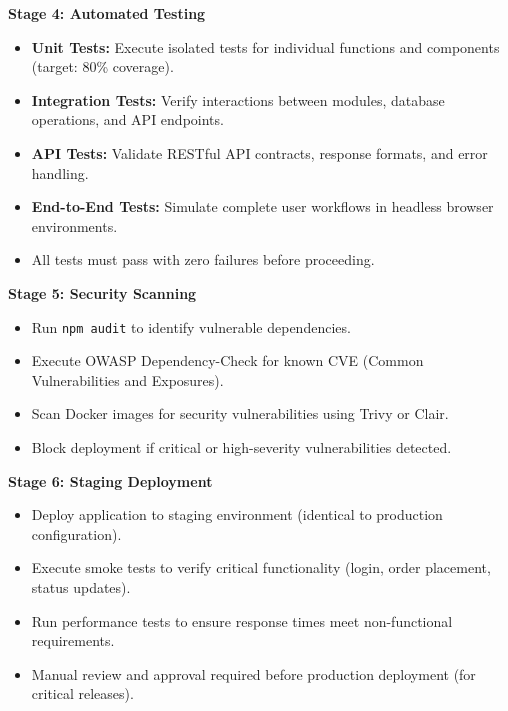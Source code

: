 \documentclass[12pt,a4paper]{article}
\begin{document}
\begin{tcolorbox}[colback=lightgray, colframe=secondaryblue, boxrule=0.8pt, arc=3pt, left=10pt, right=10pt, top=8pt, bottom=8pt]
\vspace{0.5em}

\textbf{Stage 4: Automated Testing}

\begin{itemize}[leftmargin=2em, itemsep=6pt]
    \item \textbf{Unit Tests:} Execute isolated tests for individual functions and components (target: 80\% coverage).
    \item \textbf{Integration Tests:} Verify interactions between modules, database operations, and API endpoints.
    \item \textbf{API Tests:} Validate RESTful API contracts, response formats, and error handling.
    \item \textbf{End-to-End Tests:} Simulate complete user workflows in headless browser environments.
    \item All tests must pass with zero failures before proceeding.
\end{itemize}

\vspace{0.5em}

\textbf{Stage 5: Security Scanning}

\begin{itemize}[leftmargin=2em, itemsep=6pt]
    \item Run \texttt{npm audit} to identify vulnerable dependencies.
    \item Execute OWASP Dependency-Check for known CVE (Common Vulnerabilities and Exposures).
    \item Scan Docker images for security vulnerabilities using Trivy or Clair.
    \item Block deployment if critical or high-severity vulnerabilities detected.
\end{itemize}

\vspace{0.5em}

\textbf{Stage 6: Staging Deployment}

\begin{itemize}[leftmargin=2em, itemsep=6pt]
    \item Deploy application to staging environment (identical to production configuration).
    \item Execute smoke tests to verify critical functionality (login, order placement, status updates).
    \item Run performance tests to ensure response times meet non-functional requirements.
    \item Manual review and approval required before production deployment (for critical releases).
\end{itemize}


\end{tcolorbox}
\end{document}
